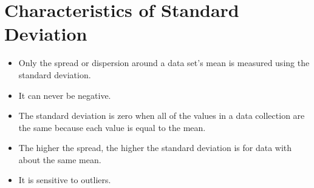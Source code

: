 \documentclass[a4paper, 12pt]{article}
\begin{document}
\section{Characteristics of Standard Deviation}
    \begin{itemize}[noitemsep]
        \item Only the spread or dispersion around a data set's mean is measured using the standard deviation.
        \item It can never be negative.
        \item The standard deviation is zero when all of the values in a data collection are the same because each value is equal to the mean.
        \item The higher the spread, the higher the standard deviation is for data with about the same mean.
        \item It is sensitive to outliers.
    \end{itemize}
\end{document}
